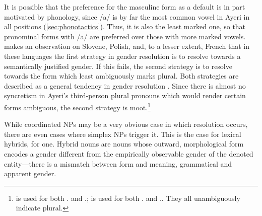 It is possible that the preference for the masculine form as a default is in
part motivated by phonology, since /a/ is by far the most common vowel in Ayeri
in all positions (\autoref{sec:phonotactics}). Thus, it is also the least
marked one, so that pronominal forms with /a/ are preferred over those with
more marked vowels. \citet{corbett1983} makes an observation on Slovene,
Polish, and, to a lesser extent, French that in these languages the first
strategy in gender resolution is to resolve towards a semantically justified
gender. If this fails, the second strategy is to resolve towards the form which
least ambiguously marks plural. Both strategies are described as a general
tendency in gender resolution \citep[205]{corbett1983}. Since there is almost
no syncretism in Ayeri's third-person plural pronouns which would render
certain forms ambiguous, the second strategy is
moot.\footnote{ is used for both \TplF{}.\Aarg{} and
\TplI{}.\Aarg{};  is used for both
\TplF{}.\Gen{} and \TplI{}.\Gen{}. They all unambiguously indicate plural.}


While coordinated NPs may be a very obvious case in which resolution occurs,
there are even cases where simplex NPs trigger it. This is the case for lexical
hybrids, for one. Hybrid nouns are nouns whose outward, morphological form
encodes a gender different from the empirically observable gender of the
denoted entity---there is a mismatch between form and meaning, grammatical and
apparent gender.

